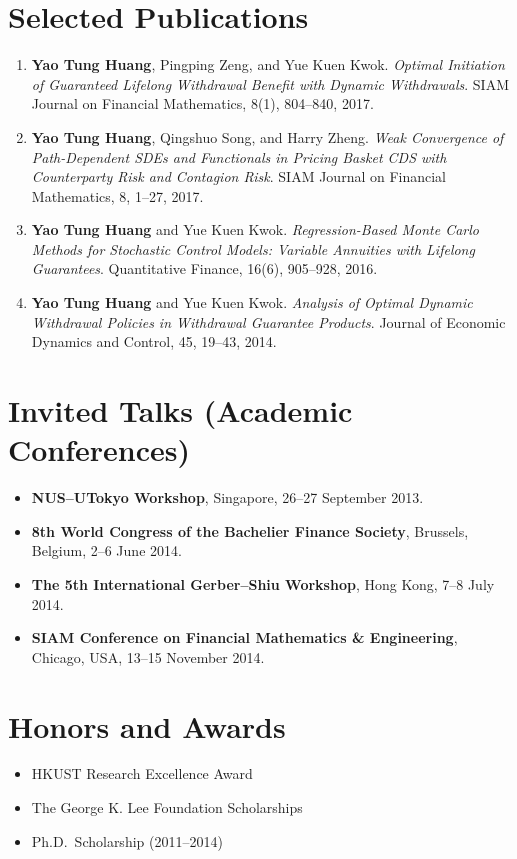 \documentclass[11pt]{article}
\begin{document}
\section{Selected Publications}
\begin{enumerate}
  \item \textbf{Yao Tung Huang}, Pingping Zeng, and Yue Kuen Kwok.
  \textit{Optimal Initiation of Guaranteed Lifelong Withdrawal Benefit with Dynamic Withdrawals}.
  SIAM Journal on Financial Mathematics, 8(1), 804--840, 2017.

  \item \textbf{Yao Tung Huang}, Qingshuo Song, and Harry Zheng.
  \textit{Weak Convergence of Path-Dependent SDEs and Functionals in Pricing Basket CDS with Counterparty Risk and Contagion Risk}.
  SIAM Journal on Financial Mathematics, 8, 1--27, 2017.

  \item \textbf{Yao Tung Huang} and Yue Kuen Kwok.
  \textit{Regression-Based Monte Carlo Methods for Stochastic Control Models: Variable Annuities with Lifelong Guarantees}.
  Quantitative Finance, 16(6), 905--928, 2016.

  \item \textbf{Yao Tung Huang} and Yue Kuen Kwok.
  \textit{Analysis of Optimal Dynamic Withdrawal Policies in Withdrawal Guarantee Products}.
  Journal of Economic Dynamics and Control, 45, 19--43, 2014.
\end{enumerate}

\section{Invited Talks (Academic Conferences)}
\begin{itemize}
  \item \textbf{NUS--UTokyo Workshop}, Singapore, 26--27 September 2013.
  \item \textbf{8th World Congress of the Bachelier Finance Society}, Brussels, Belgium, 2--6 June 2014.
  \item \textbf{The 5th International Gerber--Shiu Workshop}, Hong Kong, 7--8 July 2014.
  \item \textbf{SIAM Conference on Financial Mathematics \& Engineering}, Chicago, USA, 13--15 November 2014.
\end{itemize}

\section{Honors and Awards}
\begin{itemize}
  \item HKUST Research Excellence Award
  \item The George K. Lee Foundation Scholarships
  \item Ph.D.\ Scholarship (2011--2014)
\end{itemize}
\end{document}
